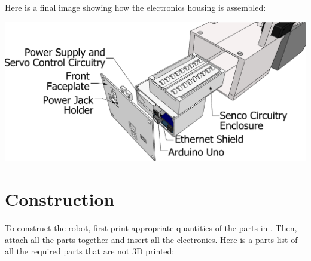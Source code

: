 \documentclass[letterpaper,10pt,english]{sphinxmanual}
\begin{document}
Here is a final image showing how the electronics housing is assembled:

\includegraphics{Scene4N.pdf}


\section{Construction}
\label{NAFSTR:construction}
To construct the robot, first print appropriate quantities of the parts in . Then, attach all the parts together and insert all the electronics. Here is a parts list of all the required parts that are not 3D printed:
\end{document}
